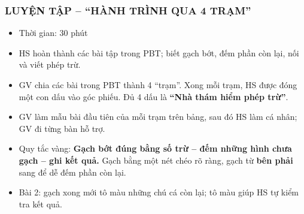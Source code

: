 \documentclass[../main.tex]{subfiles}
\begin{document}
\subsubsection{LUYỆN TẬP -- “HÀNH TRÌNH QUA 4 TRẠM”}
\begin{hd}
    \begin{itemize}
        \item Thời gian: 30 phút
        \item HS hoàn thành các bài tập trong PBT; biết gạch bớt, đếm phần còn lại, nối và viết phép trừ.
    \end{itemize}
\end{hd}
\begin{itemize}
    \item GV chia các bài trong PBT thành 4 “trạm”. Xong mỗi trạm, HS được đóng một con dấu vào góc phiếu. Đủ 4 dấu là \textbf{“Nhà thám hiểm phép trừ”}.
    \item GV làm mẫu bài đầu tiên của mỗi trạm trên bảng, sau đó HS làm cá nhân; GV đi từng bàn hỗ trợ.
\end{itemize}

\begin{itemize}
    \item Quy tắc vàng: \textbf{Gạch bớt đúng bằng số trừ -- đếm những hình chưa gạch -- ghi kết quả.} Gạch bằng một nét chéo rõ ràng, gạch từ \textbf{bên phải} sang để dễ đếm phần còn lại.
    \item Bài 2: gạch xong mới tô màu những chú cá còn lại; tô màu giúp HS tự kiểm tra kết quả.
\end{itemize}
\GAhinh
{\centering
    \hspace{1.2cm}
    \par}
\end{document}
